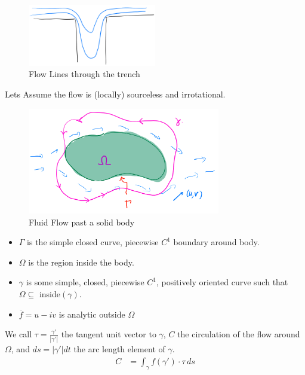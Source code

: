 \begin{example}
    \begin{figure}[H]
        \centering
        \includegraphics[width=0.5\textwidth]{LECTURE_19/trench-flow.png}
        \caption{Flow Lines through the trench}
    \end{figure}
\end{example}


\begin{example}
    Lets Assume the flow is (locally) sourceless and irrotational.
    \begin{figure}[H]
        \centering
        \includegraphics[width=0.75\textwidth]{LECTURE_19/flow-past-body.png}
        \caption{Fluid Flow past a solid body}
    \end{figure}
    \begin{itemize}
        \item $\Gamma$ is the simple closed curve, piecewise $C^1$ boundary around body.
        \item $\Omega$ is the region inside the body.
        \item $\gamma$ is some simple, closed, piecewise $C^1$, positively oriented curve such that $\Omega \subseteq$ inside$(\gamma)$.
        \item $\overline{f} = u - iv$ is analytic outside $\Omega$
    \end{itemize}
    We call $\tau = \frac{\gamma'}{|\gamma'|}$ the tangent unit vector to $\gamma$, $C$ the circulation of the flow around $\Omega$, and $ds = |\gamma'|dt$ the arc length element of $\gamma$.
    \begin{align*}
        C & = \int_\gamma f (\gamma') \cdot \tau \, ds                                                                               \\

\end{align*}
\end{example}
